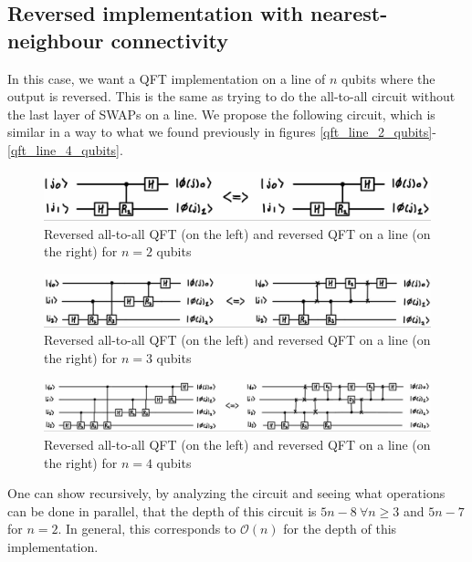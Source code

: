 \subsection{Reversed implementation with nearest-neighbour connectivity}
In this case, we want a QFT implementation on a line of $n$ qubits where the output is reversed. This is the same as trying  to do the all-to-all circuit without the last layer of SWAPs on a line. We propose the following circuit, which is similar in a way to what we found previously in figures \ref{qft_line_2_qubits}-\ref{qft_line_4_qubits}.

\begin{figure}[H]
    \centering
    \includegraphics*[scale=0.24]{images/reversed_qft_2_qubits.jpg}
    \caption{Reversed all-to-all QFT (on the left) and reversed QFT on a line (on the right) for $n=2$ qubits}
    \label{reversed_qft_line_2_qubits}
\end{figure}

\begin{figure}[H]
    \centering
    \includegraphics*[scale=0.24]{images/reversed_qft_3_qubits.jpg}
    \caption{Reversed all-to-all QFT (on the left) and reversed QFT on a line (on the right) for $n=3$ qubits}
    \label{reversed_qft_line_3_qubits}
\end{figure}

\begin{figure}[H]
    \centering
    \includegraphics*[scale=0.24]{images/reversed_qft_4_qubits.jpg}
    \caption{Reversed all-to-all QFT (on the left) and reversed QFT on a line (on the right) for $n=4$ qubits}
    \label{reversed_qft_line_4_qubits}
\end{figure}

One can show recursively, by analyzing the circuit and seeing what operations can be done in parallel, that the depth of this circuit is $5n-8 \ \forall n \geq 3$ and $5n-7$ for $n=2$. In general, this corresponds to $\mathcal{O}(n)$ for the depth of this implementation.

